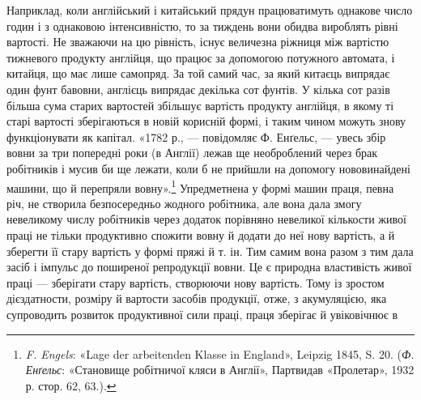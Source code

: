 Наприклад, коли англійський і китайський прядун працюватимуть
однакове число годин і з однаковою інтенсивністю, то за
тиждень вони обидва вироблять рівні вартості. Не зважаючи
на цю рівність, існує величезна ріжниця між вартістю тижневого
продукту англійця, що працює за допомогою потужного
автомата, і китайця, що має лише самопряд. За той самий час,
за який китаєць випрядає один фунт бавовни, англієць випрядає
декілька сот фунтів. У кілька сот разів більша сума старих вартостей
збільшує вартість продукту англійця, в якому ті старі
вартості зберігаються в новій корисній формі, і таким чином
можуть знову функціонувати як капітал. «1782 р., — повідомляє
Ф. Енґельс, — увесь збір вовни за три попередні роки (в Англії)
лежав ще необроблений через брак робітників і мусив би ще лежати,
коли б не прийшли на допомогу нововинайдені машини, що
й перепряли вовну».\footnote{
\emph{F. Engels}: «Lage der arbeitenden Klasse in England», Leipzig
1845, S. 20. (\emph{Ф. Енґельс}: «Становище робітничої кляси в Англії», Партвидав
«Пролетар», 1932 р. стор. 62, 63.).
} Упредметнена у формі машин праця,
певна річ, не створила безпосередньо жодного робітника, але
вона дала змогу невеликому числу робітників через додаток
порівняно невеликої кількости живої праці не тільки продуктивно
спожити вовну й додати до неї нову вартість, а й зберегти її стару
вартість у формі пряжі й т. ін. Тим самим вона разом з тим дала
засіб і імпульс до поширеної репродукції вовни. Це є природна
властивість живої праці — зберігати стару вартість, створюючи
нову вартість. Тому із зростом дієздатности, розміру й вартости
засобів продукції, отже, з акумуляцією, яка супроводить розвиток
продуктивної сили праці, праця зберігає й увіковічнює в
